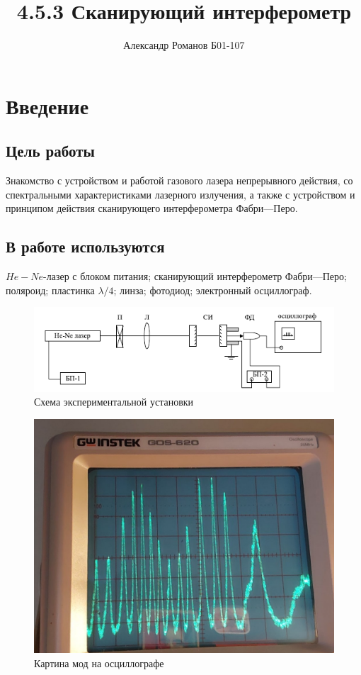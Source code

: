\documentclass{article}
\author{Александр Романов Б01-107}
\date{}
\title{4.5.3 Сканирующий интерферометр}
\begin{document}
\maketitle
\section{Введение}
\subsection{Цель работы}
Знакомство с устройством и работой газового лазера непрерывного действия, со спектральными характеристиками
лазерного излучения, а также с устройством и принципом действия сканирующего интерферометра Фабри—Перо.

\subsection{В работе используются}
\(He-Ne\)-лазер с блоком питания; сканирующий интерферометр Фабри—Перо; поляроид; пластинка \(\lambda / 4\); линза;
фотодиод; электронный осциллограф.

\begin{figure}[H]
  \centering
  \includegraphics[width=\textwidth]{device}
  \caption{Схема экспериментальной установки}
  \label{fig:device}
\end{figure}

\begin{figure}[H]
  \centering
  \includegraphics[width=\textwidth]{modes}
  \caption{Картина мод на осциллографе}
  \label{fig:modes}
\end{figure}
\end{document}
